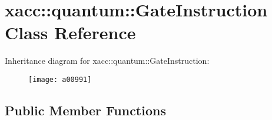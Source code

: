 \hypertarget{a00991}{}\section{xacc\+:\+:quantum\+:\+:Gate\+Instruction Class Reference}
\label{a00991}
Inheritance diagram for xacc\+:\+:quantum\+:\+:Gate\+Instruction\+:\begin{figure}[H]
\begin{center}
\leavevmode
\texttt{[image: a00991]}
\end{center}
\end{figure}
\subsection*{Public Member Functions}
